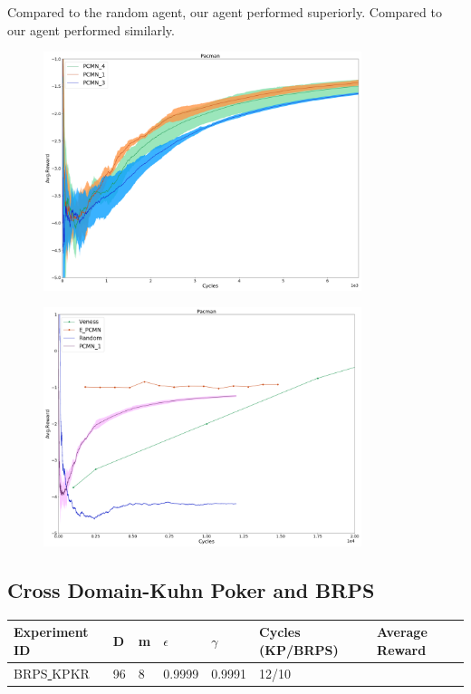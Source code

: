 \documentclass{article}
\theoremstyle{definition}
\newtheorem{primary statistics}[definition]{Primary Statistics}
\newtheorem{auxiliary statistics}[definition]{Auxiliary Statistics}
\begin{document}
Compared to the random agent, our agent performed superiorly. Compared to \citep{veness2011monte} our agent performed similarly.

 \begin{figure}[h]
 \centering
    \includegraphics[width=9.3cm]{4_Pacman}
\end{figure}

 \begin{figure}[h]
 \centering
    \includegraphics[width=9.3cm]{Pacman}
\end{figure}

\newpage


\subsection{Cross Domain-Kuhn Poker and BRPS }
 \begin{tabular}{|l|l|l|l|l|l|l|}
 \hline \centering
 Experiment ID& D & m & $\epsilon$ & $\gamma$ & Cycles (KP/BRPS) & Average Reward \\ \hline
BRPS\underline{ }KPKR  & 96       & 8           & 0.9999       & 0.9991             & 12/10     &        \\ \hline    
\end{tabular} \\
\end{document}
